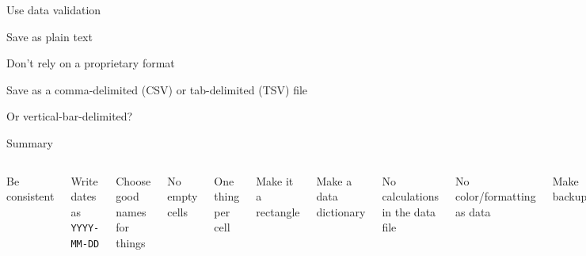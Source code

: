 \documentclass[aspectratio=169,12pt,t]{beamer}
\begin{document}
\begin{frame}[c]{Use data validation}


  \note{
  }
\end{frame}




\begin{frame}{Save as plain text}

  \bbi
\item Don't rely on a proprietary format
\item Save as a comma-delimited (CSV) or tab-delimited (TSV) file
  \bi
\item[] Or vertical-bar-delimited?
  \ei
  \ei

  \note{
  }
\end{frame}




\begin{frame}{Summary}

  \begin{columns}


    \bbe
  \item Be consistent
  \item Write dates as {\tt YYYY-MM-DD}
  \item Choose good names for things
  \item No empty cells
  \item One thing per cell
  \item Make it a rectangle
    \ee


    \bbe
    \addtocounter{enumi}{6}
  \item Make a data dictionary
  \item No calculations in the data file
  \item No color/formatting as data
  \item Make backups
  \item Use data validation
  \item Save as plain text
    \ee

    \end{columns}



\end{frame}
\end{document}
